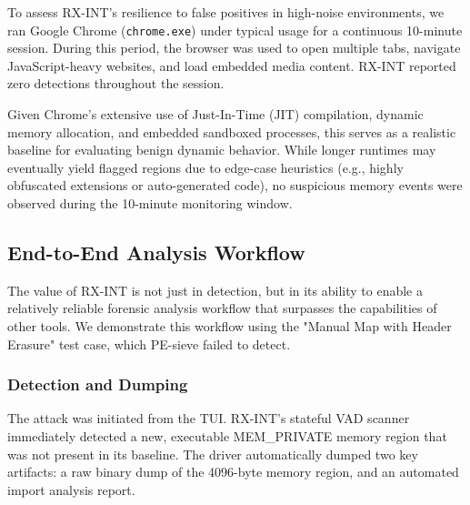 \documentclass[journal]{IEEEtran}
\begin{document}
To assess RX-INT's resilience to false positives in high-noise environments, we ran Google Chrome (\texttt{chrome.exe}) under typical usage for a continuous 10-minute session. During this period, the browser was used to open multiple tabs, navigate JavaScript-heavy websites, and load embedded media content. RX-INT reported zero detections throughout the session.

Given Chrome's extensive use of Just-In-Time (JIT) compilation, dynamic memory allocation, and embedded sandboxed processes, this serves as a realistic baseline for evaluating benign dynamic behavior. While longer runtimes may eventually yield flagged regions due to edge-case heuristics (e.g., highly obfuscated extensions or auto-generated code), no suspicious memory events were observed during the 10-minute monitoring window.


\subsection{End-to-End Analysis Workflow}
The value of RX-INT is not just in detection, but in its ability to enable a relatively reliable forensic analysis workflow that surpasses the capabilities of other tools. We demonstrate this workflow using the "Manual Map with Header Erasure" test case, which PE-sieve failed to detect.
\subsubsection{Detection and Dumping}
The attack was initiated from the TUI. RX-INT's stateful VAD scanner immediately detected a new, executable MEM\_PRIVATE memory region that was not present in its baseline. The driver automatically dumped two key artifacts: a raw binary dump of the 4096-byte memory region, and an automated import analysis report.
\end{document}
